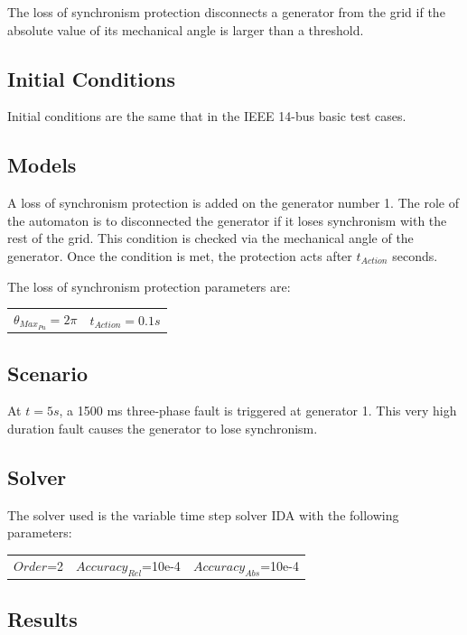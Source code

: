 \documentclass[a4paper, 12pt]{report}
\begin{document}
The loss of synchronism protection disconnects a generator from the grid if the absolute value of its mechanical angle is larger than a threshold.

\subsection{Initial Conditions}

Initial conditions are the same that in the IEEE 14-bus basic test cases.

\subsection{Models}

A loss of synchronism protection is added on the generator number 1. The role of the automaton is to disconnected the generator if it loses synchronism with the rest of the grid. This condition is checked via the mechanical angle of the generator. Once the condition is met, the protection acts after \(t_{Action}\) seconds.

The loss of synchronism protection parameters are:
\begin{center}
\begin{tabular}{l|l}
   $\theta_{Max_{Pu}}=2\pi$ & $t_{Action}=0.1s$  \\
\end{tabular}
\end{center}

\subsection{Scenario}
At $t=5s$, a 1500 ms three-phase fault is triggered at generator 1. This very high duration fault causes the generator to lose synchronism.

\subsection{Solver}
The solver used is the variable time step solver IDA with the following parameters:
\begin{center}
\begin{tabular}{l|l|l}
   $Order$=2 & $Accuracy_{Rel}$=10e-4 & $Accuracy_{Abs}$=10e-4 \\
\end{tabular}
\end{center}

\newpage
\subsection{Results}
\end{document}
